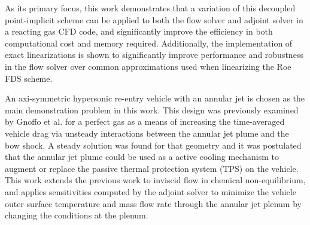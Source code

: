 As its primary focus, this work demonstrates that a variation of this decoupled
point-implicit scheme can be applied to both the flow solver and adjoint solver
in a reacting gas CFD code, and significantly improve the efficiency in both
computational cost and memory required.  Additionally, the implementation of
exact linearizations is shown to significantly improve performance and
robustness in the flow solver over common approximations used when linearizing
the Roe FDS scheme.

An axi-symmetric hypersonic re-entry vehicle with an annular jet is chosen as
the main demonstration problem in this work.  This design was previously
examined by Gnoffo et al.\cite{gnoffo2016tapping} for a perfect gas as a means
of increasing the time-averaged vehicle drag via unsteady interactions between
the annular jet plume and the bow shock.  A steady solution was found for that
geometry and it was postulated that the annular jet plume could be used as a
active cooling mechanism to augment or replace the passive thermal protection
system (TPS) on the vehicle.  This work extends the previous work to inviscid
flow in chemical non-equilibrium, and applies sensitivities computed by the
adjoint solver to minimize the vehicle outer surface temperature and mass flow
rate through the annular jet plenum by changing the conditions at the plenum.

